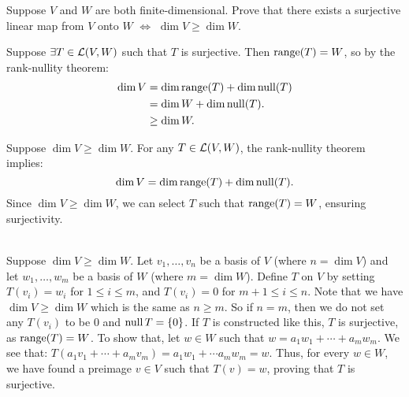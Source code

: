 \begin{xrcs}
  Suppose $V$ and $W$ are both finite-dimensional. Prove that there exists a surjective linear map from $V$ onto $W$ $\iff$ $\dim V \geq \dim W$.

  \begin{prf}
    \Rightarrowdirection Suppose $\exists T \in \mathcal{L}(V,W)$ such that $T$ is surjective. Then $\operatorname{range}(T) = W$, so by the rank-nullity theorem:
    \begin{equation}
      \begin{aligned}
        \dim V &=    \dim \operatorname{range}(T) + \dim \operatorname{null}(T) \\
        &=    \dim W + \dim \operatorname{null}(T). \\
        &\geq \dim W.
      \end{aligned}
    \end{equation}

    \Leftarrowdirection Suppose $\dim V \geq \dim W$. For any $T \in \mathcal{L}(V,W)$, the rank-nullity theorem implies:
    \begin{equation}
      \dim V = \dim \operatorname{range}(T) + \dim \operatorname{null}(T).
    \end{equation}
    Since $\dim V \geq \dim W$, we can select $T$ such that $\operatorname{range}(T) = W$, ensuring surjectivity.

     \\
    Suppose $\dim V \geq \dim W$. Let $v_1, \dots, v_n$ be a basis of $V$ (where $n = \dim V$) and let $w_1, \dots, w_m$ be a basis of $W$ (where $m = \dim W$).  Define $T$ on $V$ by setting $T(v_i) = w_i$ for $1 \leq i \leq m$, and $T(v_i) = 0$ for $m+1 \leq i \leq n$. Note that we have $\dim V \geq \dim W$ which is the same as $n \geq m$. So if $n = m$, then we do not set any $T(v_i)$ to be $0$ and $\operatorname{null} T = \{0\}$. If $T$ is constructed like this, $T$ is surjective, as $\operatorname{range}(T) = W$. To show that, let $w \in W$ such that
    $
    w = a_1 w_1 + \cdots + a_m w_m.
    $
    We see that: $T(a_1 v_1 + \cdots + a_m v_m)= a_1 w_1 + \cdots a_m w_m = w$. Thus, for every $w \in W$, we have found a preimage $v \in V$ such that $T(v) = w$, proving that $T$ is surjective.
  \end{prf}
\end{xrcs}


